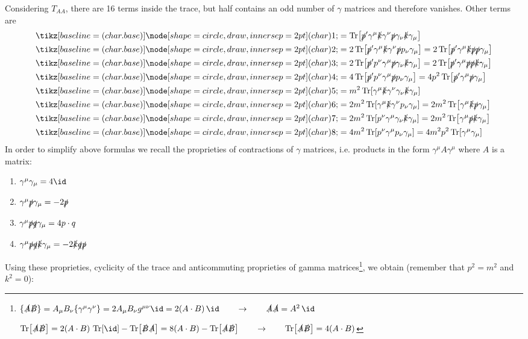 \documentclass[TheoreticalPhy_ModB.tex]{subfiles}
\begin{document}
Considering $T_{AA}$, there are 16 terms inside the trace, but half contains an odd number of $\gamma$ matrices and therefore vanishes. Other terms are
\begin{align*}
\circled 1&=\Tr[\slashed p'\gamma^\mu\slashed k\gamma^\nu\slashed p\gamma_\nu\slashed k\gamma_\mu]\\
\circled 2&=2\Tr[\slashed p'\gamma^\mu\slashed k\gamma^\nu\slashed pp_\nu\gamma_\mu ]
=2\Tr[\slashed p'\gamma^\mu\slashed k\slashed p\slashed p\gamma_\mu]\\
\circled 3&=2\Tr[\slashed p'p^\nu\gamma^\mu \slashed p\gamma_\nu\slashed k\gamma_\mu]
=2\Tr[\slashed p'\gamma^\mu \slashed p\slashed p\slashed k\gamma_\mu]\\
\circled 4&=4\Tr[\slashed p'p^\nu\gamma^\mu \slashed pp_\nu\gamma_\mu ]
=4p^2\Tr[\slashed p'\gamma^\mu \slashed p\gamma_\mu]\\
\circled 5&=m^2\Tr[\gamma^\mu\slashed k\gamma^\nu\gamma_\nu\slashed k\gamma_\mu]\\
\circled 6&=2m^2\Tr[\gamma^\mu\slashed k\gamma^\nu p_\nu\gamma_\mu ]
=2m^2\Tr[\gamma^\mu\slashed k\slashed p\gamma_\mu]\\
\circled 7&=2m^2\Tr[p^\nu\gamma^\mu \gamma_\nu\slashed k\gamma_\mu]
=2m^2\Tr[\gamma^\mu \slashed p\slashed k\gamma_\mu]\\
\circled 8&=4m^2\Tr[p^\nu\gamma^\mu p_\nu\gamma_\mu ]
=4m^2p^2\Tr[\gamma^\mu \gamma_\mu ]\\
\end{align*}
In order to simplify above formulas we recall the proprieties of contractions of $\gamma$ matrices, i.e. products in the form $\gamma^\mu A\gamma^\mu$ where $A$ is a matrix:

\begin{enumerate}
\item $\gamma^\mu\gamma_\mu=4\id$
\item $\gamma^\mu\slashed p\gamma_\mu=-2\slashed p$
\item $\gamma^\mu\slashed p\slashed q\gamma_\mu=4p\cdot q$
\item $\gamma^\mu\slashed p\slashed q\slashed k\gamma_\mu=-2\slashed k\slashed q\slashed p$
\end{enumerate}
%
Using these proprieties, cyclicity of the trace and anticommuting proprieties of gamma matrices\footnote{$\{\slashed A\slashed B\}=A_\mu B_\nu\{\gamma^\mu\gamma^\nu\}=2A_\mu B_\nu g^{\mu\nu}\id=2(A\cdot B)\,\id\qquad\rightarrow\qquad\slashed A\slashed A=A^2\,\id$

$\Tr[\slashed A\slashed B]=2(A\cdot B)\,\Tr[\id]-\Tr[\slashed B\slashed A]=8(A\cdot B)-\Tr[\slashed A\slashed B]\qquad\rightarrow\qquad\Tr[\slashed A\slashed B]=4(A\cdot B)$}, we obtain (remember that $p^2=m^2$ and $k^2=0$):
\end{document}
